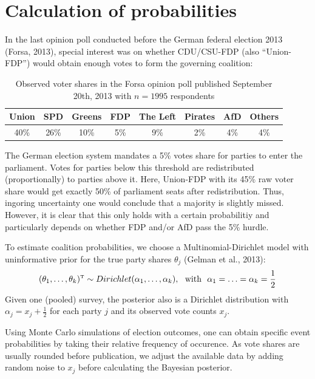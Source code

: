 \documentclass[twoside]{report}
\begin{document}
\section{Calculation of probabilities}
In the last opinion poll conducted before the German federal election 2013 (Forsa, 2013), special interest was on whether CDU/CSU-FDP (also ``Union-FDP'') would obtain enough votes to form the governing coalition:

\begin{table}[!ht]\centering
\caption{\label{bauer:tab_fdp} Observed voter shares in the Forsa opinion poll published September 20th, 2013 with $n=1995$ respondents}
\medskip
\begin{tabular}{cccccccc}
\toprule[0.09 em]
Union & SPD & Greens & FDP & The Left & Pirates & AfD & Others \\
\midrule
40\% & 26\% & 10\% & 5\% & 9\% & 2\% & 4\% & 4\% \\
\bottomrule[0.09 em]
\end{tabular}
\end{table}

The German election system mandates a 5\% votes share for parties to enter the parliament.
Votes for parties below this threshold are redistributed (proportionally) to parties
above it.
Here, Union-FDP with its 45\% raw voter share would get exactly 50\% of parliament seats after redistribution. Thus, ingoring uncertainty one would conclude that a majority is slightly missed. However, it is clear that this only holds with a certain probabilitiy and particularly depends on whether FDP and/or AfD pass the 5\% hurdle.


To estimate coalition probabilities, we choose a Multinomial-Dirichlet model with uninformative prior for the true party shares
$\theta_j$ (Gelman et al., 2013):
$$
(\theta_1,\ldots,\theta_k)^{ \mathrm{\scriptscriptstyle T} } \sim Dirichlet(\alpha_1,\ldots,\alpha_k), \ \ \text{with} \ \ \alpha_1 = \ldots = \alpha_k = \frac{1}{2}
$$
Given one (pooled) survey, the posterior also is a Dirichlet distribution
with $\alpha_j = x_j + \frac{1}{2}$ for each party $j$ and its observed
vote counts $x_j$.

Using Monte Carlo simulations of election outcomes, one can obtain
specific event probabilities by taking their relative frequency of
occurence. As vote shares are usually rounded before publication,
we adjust the available data by adding random noise to $x_j$ before
calculating the Bayesian posterior.
\end{document}
